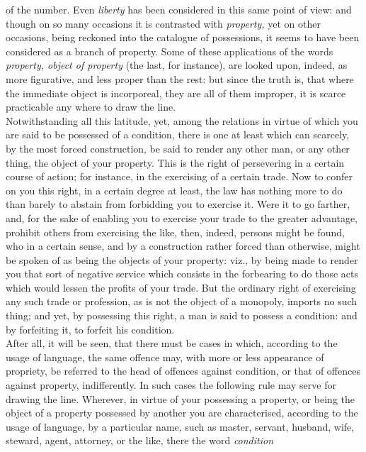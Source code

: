 \documentclass[12pt]{report}
\begin{document}
of the number. Even \emph{liberty} has been considered in this same
point of view: and though on so many occasions it is contrasted with
\emph{property,} yet on other occasions, being reckoned into the
catalogue of possessions, it seems to have been considered as a branch
of property. Some of these applications of the words \emph{property,
object of property} (the last, for instance), are looked upon, indeed,
as more figurative, and less proper than the rest: but since the truth
is, that where the immediate object is incorporeal, they are all of them
improper, it is scarce practicable any where to draw the line.\\
Notwithstanding all this latitude, yet, among the relations in virtue of
which you are said to be possessed of a condition, there is one at least
which can scarcely, by the most forced construction, be said to render
any other man, or any other thing, the object of your property. This is
the right of persevering in a certain course of action; for instance, in
the exercising of a certain trade. Now to confer on you this right, in a
certain degree at least, the law has nothing more to do than barely to
abstain from forbidding you to exercise it. Were it to go farther, and,
for the sake of enabling you to exercise your trade to the greater
advantage, prohibit others from exercising the like, then, indeed,
persons might be found, who in a certain sense, and by a construction
rather forced than otherwise, might be spoken of as being the objects of
your property: viz., by being made to render you that sort of negative
service which consists in the forbearing to do those acts which would
lessen the profits of your trade. But the ordinary right of exercising
any such trade or profession, as is not the object of a monopoly,
imports no such thing; and yet, by possessing this right, a man is said
to possess a condition: and by forfeiting it, to forfeit his
condition.\\
After all, it will be seen, that there must be cases in which, according
to the usage of language, the same offence may, with more or less
appearance of propriety, be referred to the head of offences against
condition, or that of offences against property, indifferently. In such
cases the following rule may serve for drawing the line. Wherever, in
virtue of your possessing a property, or being the object of a property
possessed by another you are characterised, according to the usage of
language, by a particular name, such as master, servant, husband, wife,
steward, agent, attorney, or the like, there the word \emph{condition}
\end{document}
